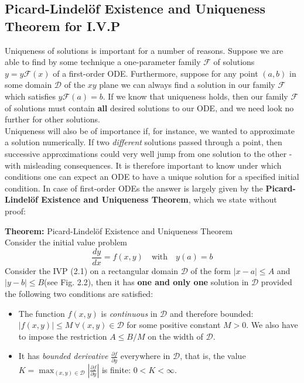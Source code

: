 \documentclass[11pt,a4paper,twoside]{report}
\begin{document}
	\subsection{Picard-Lindel\"{o}f Existence and Uniqueness Theorem for I.V.P}
	Uniqueness of solutions is important for a number of reasons. Suppose we are able to find by some technique a one-parameter family $\mathcal{F}$ of solutions $y = y\mathcal{F}(x)$ of a first-order ODE. Furthermore, suppose for any point $(a, b)$ in some domain $\mathcal{D}$ of the $xy$ plane we can always find a solution in our family $\mathcal{F}$ which satisfies $y\mathcal{F}(a) = b$. If we know that uniqueness holds, then our family $\mathcal{F}$ of solutions must contain \textbf{all} desired solutions to our ODE, and we need look no further for other solutions.\\
	Uniqueness will also be of importance if, for instance, we wanted to approximate a solution numerically. If two \textit{different} solutions passed through a point, then successive approximations could very well jump from one solution to the other - with misleading consequences. It is therefore important to know under which conditions one can expect an ODE to have a unique solution for a specified initial condition. In case of first-order ODEs the answer is largely given by the \textbf{Picard-Lindel\"{o}f Existence and Uniqueness Theorem}, which we state without proof:\par
	\textbf{Theorem:} Picard-Lindel\"{o}f Existence and Uniqueness Theorem\\
	Consider the initial value problem
	\begin{equation}
		\frac{dy}{dx} = f(x,y) \quad \text{with} \quad y(a) = b
	\end{equation}
	Consider the IVP (2.1) on a rectangular domain $\mathcal{D}$ of the form $|x − a| \leq A$ and $|y − b| \leq B$(see Fig. 2.2), then it has \textbf{one and only one} solution in $\mathcal{D}$ provided the following two conditions are satisfied:
	\begin{itemize}
		\item The function $f(x, y)$ is \textit{continuous} in $\mathcal{D}$ and therefore bounded: $|f(x, y)| \leq M\ \forall (x, y) \in \mathcal{D}$ for some positive constant $M > 0$. We also have to impose the restriction $A \leq B/M$ on the width of $\mathcal{D}$.
		\item  It has \textit{bounded derivative} $\frac{\partial f}{\partial y}$ everywhere in $\mathcal{D}$, that is, the value $K=\max _{(x,y)\in \mathcal{D}}\left\lvert \frac{\partial f}{\partial y}\right\rvert $ is finite: $0<K<\infty$.
	\end{itemize}
\end{document}
